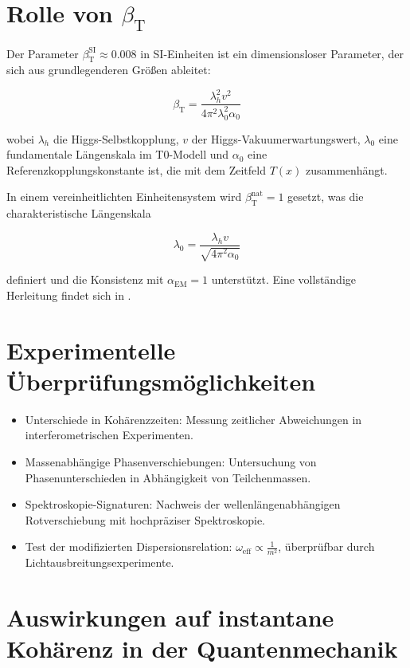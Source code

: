\documentclass[12pt,a4paper]{article}
\newcommand{\Tfield}{T(x)}
\newcommand{\betaT}{\beta_{\text{T}}}
\newcommand{\alphaEM}{\alpha_{\text{EM}}}
\begin{document}
	\section{Rolle von \(\betaT\)}
	Der Parameter \(\betaT^{\text{SI}} \approx 0.008\) in SI-Einheiten ist ein dimensionsloser Parameter, der sich aus grundlegenderen Größen ableitet:
	
	\begin{equation}
		\betaT = \frac{\lambda_h^2 v^2}{4\pi^2 \lambda_0^2 \alpha_0}
	\end{equation}
	
	wobei \(\lambda_h\) die Higgs-Selbstkopplung, \(v\) der Higgs-Vakuumerwartungswert, \(\lambda_0\) eine fundamentale Längenskala im T0-Modell und \(\alpha_0\) eine Referenzkopplungskonstante ist, die mit dem Zeitfeld \(\Tfield\) zusammenhängt.
	
	In einem vereinheitlichten Einheitensystem wird \(\betaT^{\text{nat}} = 1\) gesetzt, was die charakteristische Längenskala
	
	\begin{equation}
		\lambda_0 = \frac{\lambda_h v}{\sqrt{4\pi^2 \alpha_0}}
	\end{equation}
	
	definiert und die Konsistenz mit \(\alphaEM = 1\) unterstützt. Eine vollständige Herleitung findet sich in \cite{pascher_params_2025, pascher_alphabeta_2025}.
	
	\section{Experimentelle Überprüfungsmöglichkeiten}
	\begin{itemize}
		\item Unterschiede in Kohärenzzeiten: Messung zeitlicher Abweichungen in interferometrischen Experimenten.
		\item Massenabhängige Phasenverschiebungen: Untersuchung von Phasenunterschieden in Abhängigkeit von Teilchenmassen.
		\item Spektroskopie-Signaturen: Nachweis der wellenlängenabhängigen Rotverschiebung mit hochpräziser Spektroskopie.
		\item Test der modifizierten Dispersionsrelation: \( \omega_{\text{eff}} \propto \frac{1}{m^2} \), überprüfbar durch Lichtausbreitungsexperimente.
	\end{itemize}
	
	\section{Auswirkungen auf instantane Kohärenz in der Quantenmechanik}
\end{document}
